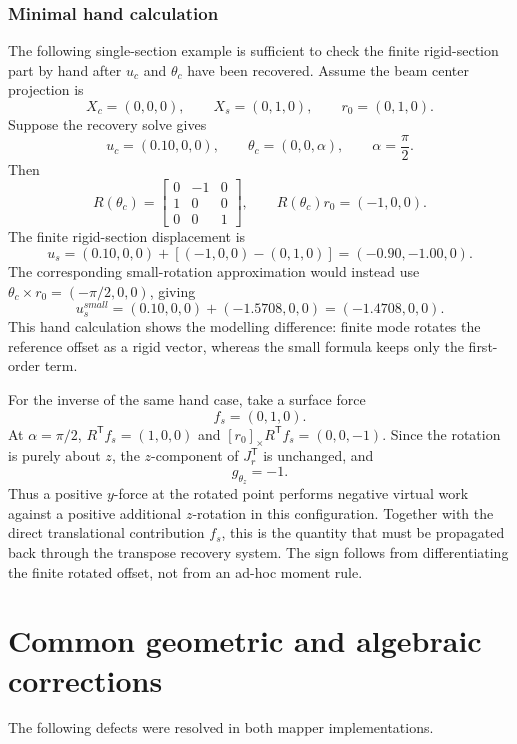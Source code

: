 \documentclass[11pt,a4paper]{article}
\newcommand{\T}{\mathsf{T}}
\begin{document}
\subsubsection{Minimal hand calculation}

The following single-section example is sufficient to check the finite
rigid-section part by hand after \(u_c\) and \(\theta_c\) have been recovered.
Assume the beam center projection is
\[
  X_c=(0,0,0),\qquad
  X_s=(0,1,0),
  \qquad
  r_0=(0,1,0).
\]
Suppose the recovery solve gives
\[
  u_c=(0.10,0,0),
  \qquad
  \theta_c=(0,0,\alpha),
  \qquad
  \alpha=\frac{\pi}{2}.
\]
Then
\[
  R(\theta_c)=
  \begin{bmatrix}
    0&-1&0\\
    1& 0&0\\
    0& 0&1
  \end{bmatrix},
  \qquad
  R(\theta_c)r_0=(-1,0,0).
\]
The finite rigid-section displacement is
\[
  u_s
  =
  (0.10,0,0)
  +
  \left[(-1,0,0)-(0,1,0)\right]
  =
  (-0.90,-1.00,0).
\]
The corresponding small-rotation approximation would instead use
\(\theta_c\times r_0=(-\pi/2,0,0)\), giving
\[
  u_s^{small}
  =
  (0.10,0,0)+(-1.5708,0,0)
  =
  (-1.4708,0,0).
\]
This hand calculation shows the modelling difference: finite mode rotates
the reference offset as a rigid vector, whereas the small formula keeps only
the first-order term.

For the inverse of the same hand case, take a surface force
\[
  f_s=(0,1,0).
\]
At \(\alpha=\pi/2\), \(R^\T f_s=(1,0,0)\) and
\([r_0]_\times R^\T f_s=(0,0,-1)\).  Since the rotation is purely about
\(z\), the \(z\)-component of \(J_r^\T\) is unchanged, and
\[
  g_{\theta_z}=-1.
\]
Thus a positive \(y\)-force at the rotated point performs negative virtual
work against a positive additional \(z\)-rotation in this configuration.
Together with the direct translational contribution \(f_s\), this is the
quantity that must be propagated back through the transpose recovery system.
The sign follows from differentiating the finite rotated offset, not from an
ad-hoc moment rule.

\section{Common geometric and algebraic corrections}

The following defects were resolved in both mapper implementations.
\end{document}
